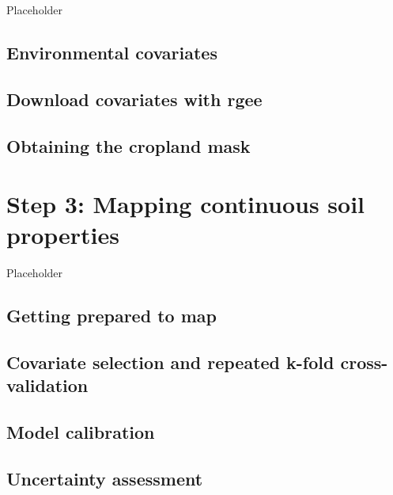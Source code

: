 \documentclass[
  10pt,
  b5paper,
  oneside]{book}
\begin{document}
Placeholder

\hypertarget{environmental-covariates-1}{%
\section{Environmental covariates}\label{environmental-covariates-1}}

\hypertarget{download-covariates-with-rgee}{%
\section{Download covariates with rgee}\label{download-covariates-with-rgee}}

\hypertarget{obtaining-the-cropland-mask}{%
\section{Obtaining the cropland mask}\label{obtaining-the-cropland-mask}}

\hypertarget{step-3-mapping-continuous-soil-properties}{%
\chapter{Step 3: Mapping continuous soil properties}\label{step-3-mapping-continuous-soil-properties}}

Placeholder

\hypertarget{getting-prepared-to-map}{%
\section{Getting prepared to map}\label{getting-prepared-to-map}}

\hypertarget{covariate-selection-and-repeated-k-fold-cross-validation}{%
\section{Covariate selection and repeated k-fold cross-validation}\label{covariate-selection-and-repeated-k-fold-cross-validation}}

\hypertarget{model-calibration}{%
\section{Model calibration}\label{model-calibration}}

\hypertarget{uncertainty-assessment}{%
\section{Uncertainty assessment}\label{uncertainty-assessment}}
\end{document}
